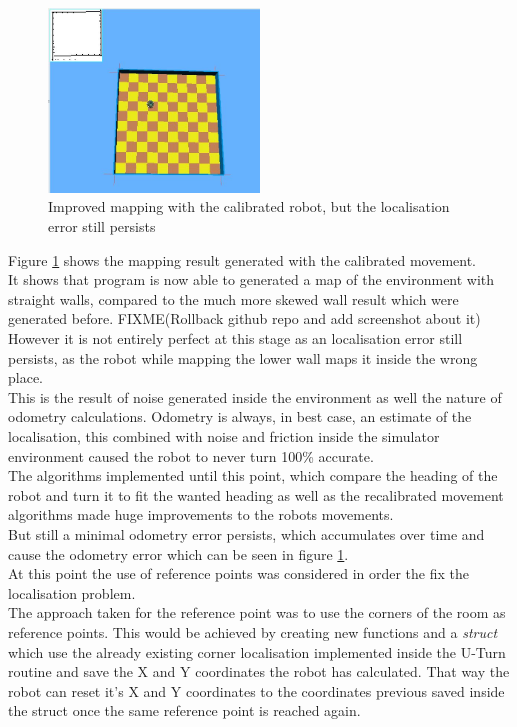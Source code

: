 \begin{figure}[h]
\centering
\includegraphics[width = 0.5\textwidth]{../../figures/odometry_error} 
\caption{Improved mapping with the calibrated robot, but the localisation error still persists}
\label{odometry_error}
\end{figure}

Figure \ref{odometry_error} shows the mapping result generated with the calibrated movement.\\
It shows that program is now able to generated a map of the environment with straight walls, compared to the much more skewed wall result which were generated before. 
FIXME(Rollback github repo and add screenshot about it)\\

However it is not entirely perfect at this stage as an localisation error still persists, as the robot while mapping the lower wall maps it inside the wrong place. \\
This is the result of noise generated inside the environment as well the nature of odometry calculations.
Odometry is always, in best case, an estimate of the localisation, this combined with noise and friction inside the simulator environment caused the robot to never turn 100\% accurate. \\
The algorithms implemented until this point, which compare the heading of the robot and turn it to fit the wanted heading as well as the recalibrated movement algorithms made huge improvements to the robots movements.\\
But still a minimal odometry error persists, which accumulates over time and cause the odometry error which can be seen in figure \ref{odometry_error}. \\[3ex]

At this point the use of reference points was considered in order the fix the localisation problem.\\
The approach taken for the reference point was to use the corners of the room as reference points.
This would be achieved by creating new functions and a \textit{struct }which use the already existing corner localisation implemented inside the U-Turn routine and save the X and Y coordinates the robot has calculated. 
That way the robot can reset it's X and Y coordinates to the coordinates previous saved inside the struct once the same reference point is reached again.\\












 




